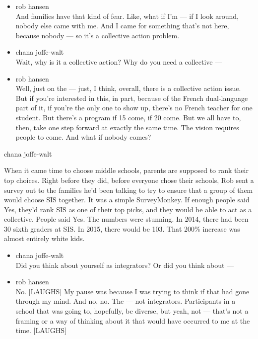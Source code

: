 \begin{itemize}
\item
  rob hansen\\
  And families have that kind of fear. Like, what if I'm --- if I look
  around, nobody else came with me. And I came for something that's not
  here, because nobody --- so it's a collective action problem.
\item
  chana joffe-walt\\
  Wait, why is it a collective action? Why do you need a collective ---
\item
  rob hansen\\
  Well, just on the --- just, I think, overall, there is a collective
  action issue. But if you're interested in this, in part, because of
  the French dual-language part of it, if you're the only one to show
  up, there's no French teacher for one student. But there's a program
  if 15 come, if 20 come. But we all have to, then, take one step
  forward at exactly the same time. The vision requires people to come.
  And what if nobody comes?
\end{itemize}

chana joffe-walt

When it came time to choose middle schools, parents are supposed to rank
their top choices. Right before they did, before everyone chose their
schools, Rob sent a survey out to the families he'd been talking to try
to ensure that a group of them would choose SIS together. It was a
simple SurveyMonkey. If enough people said Yes, they'd rank SIS as one
of their top picks, and they would be able to act as a collective.
People said Yes. The numbers were stunning. In 2014, there had been 30
sixth graders at SIS. In 2015, there would be 103. That 200\% increase
was almost entirely white kids.

\begin{itemize}
\item
  chana joffe-walt\\
  Did you think about yourself as integrators? Or did you think about
  ---
\item
  rob hansen\\
  No. {[}LAUGHS{]} My pause was because I was trying to think if that
  had gone through my mind. And no, no. The --- not integrators.
  Participants in a school that was going to, hopefully, be diverse, but
  yeah, not --- that's not a framing or a way of thinking about it that
  would have occurred to me at the time. {[}LAUGHS{]}
\end{itemize}

